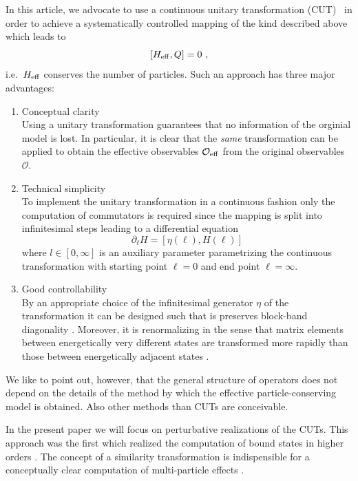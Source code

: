 In this article, we advocate to use a continuous unitary
transformation (CUT)~\cite{wegne94,stein97,mielk98,knett00a} 
in order to achieve a systematically controlled mapping of the kind
described above which leads to
\begin{equation}
  \label{H_Q_com}
  [H_{\rm eff},Q]=0\ ,
\end{equation}
i.e.\ $H_{\rm eff}$ conserves the number of particles. Such an approach
has three major advantages:
\begin{enumerate}
\item
Conceptual clarity\\
Using a unitary transformation guarantees that no information
of the orginial model is lost. In particular,
it is clear that the {\it same} transformation 
\cite{wegne94,kehre97,knett01b,schmi01} can be applied to obtain the effective
observables  ${\mathcal O}_{\rm eff}$ from the original observables
${\mathcal  O}$. 
\item
Technical simplicity\\
To implement the unitary transformation in a continuous fashion
only the computation of commutators is required since the mapping
is split into infinitesimal steps leading to a differential equation
\cite{wegne94}
\begin{equation}
\label{flow}
\partial_\ell H = [\eta(\ell), H(\ell)]
\end{equation}
where $l\in[0,\infty]$ is an auxiliary parameter parametrizing
the continuous transformation with starting point $\ell=0$ and
end point $\ell=\infty$.
\item
Good controllability\\
By an appropriate choice of the infinitesimal generator $\eta$
of the transformation it can be designed such that is 
preserves block-band diagonality \cite{knett00a,mielk98}.
Moreover, it is renormalizing in the sense that matrix elements
between energetically very different states are transformed
more rapidly than those between energetically adjacent states
\cite{heidb02a,heidb02b,mielk98}.
\end{enumerate}

We like to point out, however, that the general structure of operators
does not depend on the details of the method by which the effective
particle-conserving model is obtained. Also other methods than CUTs
are conceivable. 

In the present paper we will focus on perturbative realizations of
the CUTs. This approach \cite{knett00a} was the first which realized
 the computation of bound states in higher orders \cite{uhrig98c,knett00b}.
The concept of a similarity transformation
is indispensible for a conceptually clear computation
of multi-particle effects \cite{trebs00,zheng01a}.
  


